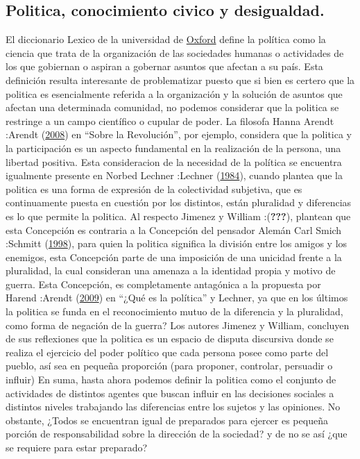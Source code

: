 \documentclass[
]{article}
\begin{document}
\hypertarget{politica-conocimiento-civico-y-desigualdad.}{%
\subsection{Politica, conocimiento civico y
desigualdad.}\label{politica-conocimiento-civico-y-desigualdad.}}

El diccionario Lexico de la universidad de
\href{https://www.lexico.com/es/definicion/politica}{Oxford} define la
política como la ciencia que trata de la organización de las sociedades
humanas o actividades de los que gobiernan o aspiran a gobernar asuntos
que afectan a su país. Esta definición resulta interesante de
problematizar puesto que si bien es certero que la politica es
esencialmente referida a la organización y la solución de asuntos que
afectan una determinada comunidad, no podemos considerar que la politica
se restringe a un campo científico o cupular de poder. La filosofa Hanna
Arendt :Arendt
(\protect\hyperlink{ref-arendtSobreRevolucion2008b}{2008}) en ``Sobre la
Revolución'', por ejemplo, considera que la politica y la participación
es un aspecto fundamental en la realización de la persona, una libertad
positiva. Esta consideracion de la necesidad de la política se encuentra
igualmente presente en Norbed Lechner :Lechner
(\protect\hyperlink{ref-lechnerConflictivaNuncaAcabada1984}{1984}),
cuando plantea que la politica es una forma de expresión de la
colectividad subjetiva, que es continuamente puesta en cuestión por los
distintos, están pluralidad y diferencias es lo que permite la politica.
Al respecto Jimenez y William :({\textbf{???}}), plantean que esta
Concepción es contraria a la Concepción del pensador Alemán Carl Smich
:Schmitt
(\protect\hyperlink{ref-schmittConceptoPoliticoTexto1998}{1998}), para
quien la politica significa la división entre los amigos y los enemigos,
esta Concepción parte de una imposición de una unicidad frente a la
pluralidad, la cual consideran una amenaza a la identidad propia y
motivo de guerra. Esta Concepción, es completamente antagónica a la
propuesta por Harend :Arendt
(\protect\hyperlink{ref-arendtQueEsPolitica2009}{2009}) en ``¿Qué es la
política'' y Lechner, ya que en los últimos la politica se funda en el
reconocimiento mutuo de la diferencia y la pluralidad, como forma de
negación de la guerra? Los autores Jimenez y William, concluyen de sus
reflexiones que la politica es un espacio de disputa discursiva donde se
realiza el ejercicio del poder político que cada persona posee como
parte del pueblo, así sea en pequeña proporción (para proponer,
controlar, persuadir o influir) En suma, hasta ahora podemos definir la
politica como el conjunto de actividades de distintos agentes que buscan
influir en las decisiones sociales a distintos niveles trabajando las
diferencias entre los sujetos y las opiniones. No obstante, ¿Todos se
encuentran igual de preparados para ejercer es pequeña porción de
responsabilidad sobre la dirección de la sociedad? y de no se así ¿que
se requiere para estar preparado?
\end{document}
